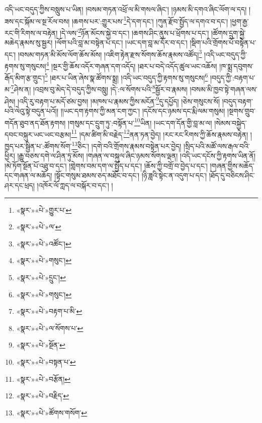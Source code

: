 འདི་ཡང་བདུད་ཀྱིས་བསླུས་པ་ཡིན། །བསམ་གཏན་འཕྲོ་ལ་མི་གསལ་ཞིང་། །ཉམས་མི་དགའ་ཞིང་ལོག་ལ་དད། །ཟས་དང་སྐོམ་ལ་སྔ་རོལ་བས། །ཆགས་པར་:གྱུར་པས་\footnote{«སྣར་»«པེ་»གྱུར་པ་}དེ་དག་དང་། །ཀུན་རྫོབ་སྤྱོད་ལ་དགའ་བ་དང་། །ཕྱག་རྒྱ་རང་གི་རིགས་ལ་བརྟེན། །དེ་ལས་\footnote{«སྣར་»«པེ་»ལ་}ཉོན་མོངས་སྐྱེ་བ་དང་། །ཆགས་ཤིང་ནུས་པ་ཕྲོགས་པ་དང་། །ཚོགས་དྲུག་སྐྱེ་མཆེད་རྣམས་སུ་སྦྱར། །ལོག་པའི་བླ་མ་བསྟེན་པ་དང་། །ཡང་དག་བླ་མ་དོར་བ་དང་། །སྡིག་པའི་གྲོགས་པོ་བསྟེན་པ་དང་། །བསམ་གཏན་མི་མོས་ལོག་ཆོས་མོས། །འཇིག་རྟེན་རྫས་སོགས་ཆོས་རྣམས་འཚོད།\footnote{«སྣར་»«པེ་»འཚོང་།} །འདི་ཡང་བདུད་ཀྱི་རྟགས་སུ་གསུངས།\footnote{«སྣར་»«པེ་»གསུང་།} །སྔར་གྱི་ཆོས་འདོར་གཞན་དག་འདོད། །ཐར་པ་བདེ་འདོད་ཚུལ་ཡང་འཆོས། །ཁ་སྨྲ་དབུགས་རྒོད་མིག་རྩ་གྲུང་།\footnote{«སྣར་»«པེ་»དྲུང་།} །ཐར་པ་ཡིན་ཞེས་སྣ་ཚོགས་སྨྲ། །འདི་ཡང་བདུད་ཀྱི་རྟགས་སུ་གསུངས།\footnote{«སྣར་»«པེ་»གསུང་།} །བདུད་ཀྱི་:བརྟག་པ་མ་\footnote{«སྣར་»«པེ་»བརྟག་པ་མི་}ཤེས་ན། །འབྲས་བུ་མེད་དེ་བདུད་ཀྱིས་བསླུ། །དེ་:ལ་སོགས་པའི་\footnote{«སྣར་»«པེ་»ལ་སོགས་པ་}སྦྱོར་བ་རྣམས། །བསམ་མི་ཁྱབ་སྟེ་གཞན་ལས་ཤེས། །འདི་རུ་བརྟག་པ་མདོ་ཙམ་བྱས། །མཁས་པ་རྣམས་ཀྱིས་མངོན་\footnote{«སྣར་»«པེ་»སྔོན་}དུ་དཔྱོད། །ཅེས་གསུངས་སོ། །བདུད་བརྟག་པའི་ལེའུ་སྟེ་བདུན་པའོ།། །།ཡང་དག་རྟགས་ཀྱི་མན་ངག་ཀྱང་། །དངོས་དང་ཉམས་དང་རྨི་ལམ་གསུམ། །སྔགས་གྲུབ་གདོན་ཐུབ་ནད་ཐོན་རྟགས། །གསུམ་དང་དྲུག་ཏུ་:བསྟོན་པ་\footnote{«སྣར་»«པེ་»བསྟན་པ་}ཡིན། །ཡང་དག་དོན་གྱི་བླ་མ་ལ། །སེམས་བསྐྱེད་དབང་བསྐུར་ཡང་ཡང་བརྩམ།\footnote{«སྣར་»«པེ་»བརྩོན།} །དམ་ཚིག་མི་བརྗེད་\footnote{«སྣར་»«པེ་»བརྗིད་}ནན་ཏན་བྱེད། །རང་རང་རིགས་ཀྱི་ཆོས་རྣམས་བརྟེན། །ཁྱད་པར་སྦྱིན་པ་:ཚོགས་སོག་\footnote{«སྣར་»«པེ་»ཚོགས་གསོག་}ཅིང་། །དགེ་བའི་གྲོགས་རྣམས་བསྟེན་པར་བྱེད། །སྲིད་པའི་མཚོ་ལས་རྒལ་བའི་ཕྱིར། །རྒྱུ་བཅས་དགེ་ལ་ཤིན་ཏུ་མོས། །གཞན་ལ་བསྐུལ་ཞིང་ཉམས་སོགས་ལྡན། །འདི་ཡང་དངོས་ཀྱི་རྟགས་ཡིན་ནོ། །མེ་ཏོག་སྔོན་པོ་འཐུ་བ་དང་། །གླེགས་བམ་དག་ལ་སྤྱོད་པ་དང་། །ཆོས་ཀྱི་བགྲོ་བ་བྱེད་པ་དང་། །གཞན་གྱིས་མཆོད་དང་གཞན་ལ་མཆོད། །སྟོང་གསུམ་ཐམས་ཅད་མཐོང་བ་དང་། །ཉི་ཟླའི་སྟེང་ན་འདུག་པ་དང་། །ཐོད་དུ་བཅིངས་ཤིང་ཤར་དང་ཕྲད། །འཁོར་ལོ་ཀླད་ལ་བསྐོར་བ་དང་། །
